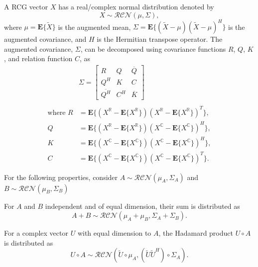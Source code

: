 \begin{notation}
A RCG vector $X$ has a real/complex normal distribution denoted by
\begin{equation}
X \sim \mathcal{RCN}(\mu,\Sigma),
\label{eq:RCNdistribution_defn}
\end{equation}
where $\mu = \textbf{E}\{\widetilde{X}\}$ is the augmented mean, $\Sigma = \textbf{E} \{ (\widetilde{X} - \mu)(\widetilde{X}-\mu)^H \}$ is the augmented covariance, and $H$ is the Hermitian transpose operator. The augmented covariance, $\Sigma$, can be decomposed using covariance functions $R$, $Q$, $K$, and relation function $C$, as
\begin{align}
&\Sigma = \begin{bmatrix}  R & Q & \overline{Q} \\ Q^H & K & C \\ \overline{Q^H} & C^H & \overline{K}\end{bmatrix} \label{eqn:augmented_covariance} \\ \nonumber \\
\text{where } 	R &= \textbf{E}\{(X^{\mathbb{R}} - \textbf{E}\{{X^{\mathbb{R}}}\})(X^{\mathbb{R}} - \textbf{E}\{{X^{\mathbb{R}}}\})^T\}, \nonumber \\ 
			Q &= \textbf{E}\{(X^{\mathbb{R}} - \textbf{E}\{{X^{\mathbb{R}}}\})(X^{\mathbb{C}} - \textbf{E}\{{X^{\mathbb{C}}}\})^H\}, \nonumber \\ 
			K &= \textbf{E}\{(X^{\mathbb{C}}- \textbf{E}\{{X^{\mathbb{C}}}\})(X^{\mathbb{C}}- \textbf{E}\{{X^{\mathbb{C}}}\})^H\}, \nonumber \\ 
			C &= \textbf{E}\{(X^{\mathbb{C}} - \textbf{E}\{{X^{\mathbb{C}}}\})(X^{\mathbb{C}} - \textbf{E}\{{X^{\mathbb{C}}}\})^T\}. \nonumber
\end{align}
\end{notation}

For the following properties, consider $A \sim \mathcal{RCN}(\mu_A,\Sigma_A)$ and $B \sim \mathcal{RCN}(\mu_B,\Sigma_B)$

\begin{property}
\label{prop:IndSum}
For $A$ and $B$ independent and of equal dimension, their sum is distributed as
\begin{equation}
A+B \sim \mathcal{RCN}(\mu_A + \mu_B,\Sigma_A+\Sigma_B).
\end{equation}
\end{property}

\begin{property}
\label{prop:HadProd}
For a complex vector $U$ with equal dimension to $A$, the Hadamard product $U \circ A$ is distributed as
\begin{equation}
U \circ A \sim \mathcal{RCN}(\widetilde{U} \circ \mu_A,(\widetilde{U} \widetilde{U}^H) \circ \Sigma_A).
\end{equation}
\end{property}

